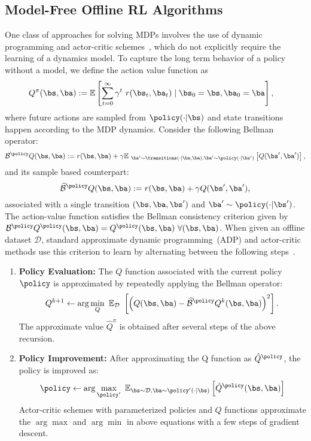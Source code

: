 \subsection{Model-Free Offline RL Algorithms}
\label{sec:conservative_model_free}
One class of approaches for solving MDPs involves the use of dynamic programming and actor-critic schemes~\cite{SuttonBook, BertsekasBook}, which do not explicitly require the learning of a dynamics model. To capture the long term behavior of a policy without a model, we define the action value function as
\begin{align}
    Q^\pi(\bs, \ba) & := \mathbb{E} \left[ \sum_{t=0}^\infty \gamma^t \ r(\bs_t, \ba_t) \mid \bs_0 = \bs, \ba_0 = \ba \right], %
\end{align}
where future actions are sampled from $\policy(\cdot|\bs)$ and state transitions happen according to the MDP dynamics. Consider the following Bellman operator:
\[
\mathcal{B}^\policy Q (\bs, \ba) := r(\bs, \ba) + \gamma \mathbb{E}_{\ \bs' \sim \transitions(\cdot | \bs, \ba), \ba' \sim \policy(\cdot | \bs')} \left[ Q(\bs', \ba') \right],
\]
and its sample based counterpart:
\[
\widehat{\mathcal{B}}^\policy Q (\bs, \ba) := r(\bs, \ba) + \gamma Q(\bs', \ba'),
\]
associated with a single transition $(\bs, \ba, \bs')$ and $\ba' \sim \policy (\cdot | \bs')$. The action-value function satisfies the Bellman consistency criterion given by $\mathcal{B}^\policy Q^\policy(\bs, \ba) = Q^\policy (\bs, \ba) \ \forall (\bs, \ba)$. When given an offline dataset $\mathcal{D}$, standard approximate dynamic programming~(ADP) and actor-critic methods use this criterion to learn by alternating between the following steps~\cite{Munos2008FiniteTimeBF}.
\begin{enumerate}[leftmargin=*]
    \item {\bf Policy Evaluation:} The $Q$ function associated with the current policy $\policy$ is approximated by repeatedly applying the Bellman operator:
    \begin{equation*}
        Q^{k+1} \leftarrow \arg \min_{Q} \ \mathbb{E}_{\mathcal{D}} \ \left[ \left( Q(\bs, \ba) -  \widehat{\mathcal{B}}^{\policy} Q^k(\bs, \ba) \right)^2 \right].
    \end{equation*}
    The approximate value $\hat{Q}^\pi$ is obtained after several steps of the above recursion.
    \item {\bf Policy Improvement:} After approximating the Q function as $\hat{Q}^\policy$, the policy is improved as:
    \[
    \policy \leftarrow \arg \max_{\policy'} \ \mathbb{E}_{\bs \sim \mathcal{D}, \ba \sim \policy'(\cdot | \bs)} \left[ \hat{Q}^\policy (\bs, \ba) \right]
    \]
    Actor-critic schemes with parameterized policies and $Q$ functions approximate the $\arg \max$ and $\arg \min$ in above equations with a few steps of gradient descent.
\end{enumerate}

